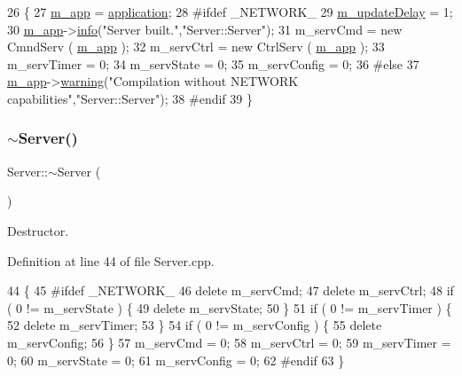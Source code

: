 \begin{DoxyCode}
26                                          \{
27   \hyperlink{classServer_ae1c25dc357c4a1145289c747fddaa251}{m\_app} = \hyperlink{Tools_8h_a27885a3c35afe79029fb830f32f66458}{application};
28 \textcolor{preprocessor}{#ifdef \_NETWORK\_}
29   \hyperlink{classServer_ae991d55181bff0552a34278ea9f76735}{m\_updateDelay} = 1;
30   \hyperlink{classServer_ae1c25dc357c4a1145289c747fddaa251}{m\_app}->\hyperlink{classObject_a644fd329ea4cb85f54fa6846484b84a8}{info}(\textcolor{stringliteral}{"Server built."},\textcolor{stringliteral}{"Server::Server"});
31   m\_servCmd    = \textcolor{keyword}{new} CmndServ ( \hyperlink{classServer_ae1c25dc357c4a1145289c747fddaa251}{m\_app} );
32   m\_servCtrl   = \textcolor{keyword}{new} CtrlServ ( \hyperlink{classServer_ae1c25dc357c4a1145289c747fddaa251}{m\_app} );
33   m\_servTimer  = 0;
34   m\_servState  = 0;
35   m\_servConfig = 0;
36 \textcolor{preprocessor}{#else}
37   \hyperlink{classServer_ae1c25dc357c4a1145289c747fddaa251}{m\_app}->\hyperlink{classObject_a65cd4fda577711660821fd2cd5a3b4c9}{warning}(\textcolor{stringliteral}{"Compilation without NETWORK capabilities"},\textcolor{stringliteral}{"Server::Server"}); 
38 \textcolor{preprocessor}{#endif  }
39 \}
\end{DoxyCode}
\mbox{\label{classServer_a4b3aa2579cb1c8cd1d069582c14d0fa6}} 
\subsubsection{\texorpdfstring{$\sim$\+Server()}{~Server()}}
{\footnotesize\ttfamily Server\+::$\sim$\+Server (\begin{DoxyParamCaption}{ }\end{DoxyParamCaption})\hspace{0.3cm}{\ttfamily [virtual]}}



Destructor. 



Definition at line 44 of file Server.\+cpp.


\begin{DoxyCode}
44                 \{
45 \textcolor{preprocessor}{#ifdef \_NETWORK\_}
46   \textcolor{keyword}{delete} m\_servCmd;
47   \textcolor{keyword}{delete} m\_servCtrl;
48   \textcolor{keywordflow}{if} ( 0 != m\_servState ) \{
49     \textcolor{keyword}{delete} m\_servState;
50   \}
51   \textcolor{keywordflow}{if} ( 0 != m\_servTimer ) \{
52     \textcolor{keyword}{delete} m\_servTimer;
53   \}
54   \textcolor{keywordflow}{if} ( 0 != m\_servConfig ) \{
55     \textcolor{keyword}{delete} m\_servConfig;
56   \}
57   m\_servCmd    = 0;
58   m\_servCtrl   = 0;
59   m\_servTimer  = 0;
60   m\_servState  = 0;
61   m\_servConfig = 0;
62 \textcolor{preprocessor}{#endif}
63 \}
\end{DoxyCode}


